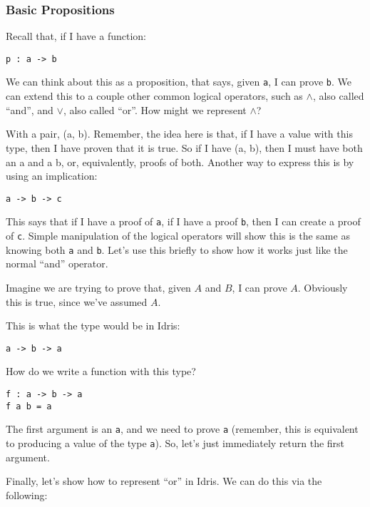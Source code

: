 \documentclass{article}
\newcommand{\inline}[1]{\texttt{#1}}
\begin{document}
\subsubsection{Basic Propositions}

Recall that, if I have a function:

\begin{verbatim}
p : a -> b
\end{verbatim}

We can think about this as a proposition, that says, given \inline{a}, I can prove \inline{b}.
We can extend this to a couple other common logical operators, such as $\wedge$, also called ``and'', and $\vee$, also called ``or''.
How might we represent $\wedge$?

With a pair, (a, b). Remember, the idea here is that, if I have a value with this type, then I have proven that it is true. So if I have (a, b), then I must have both an a and a b, or, equivalently, proofs of both. Another way to express this is by using an implication:

\begin{verbatim}
a -> b -> c
\end{verbatim}

This says that if I have a proof of \inline{a}, if I have a proof \inline{b}, then I can create a proof of \inline{c}.
Simple manipulation of the logical operators will show this is the same as knowing both \inline{a} and \inline{b}. %
Let’s use this briefly to show how it works just like the normal ``and'' operator.

Imagine we are trying to prove that, given $A$ and $B$, I can prove $A$.
Obviously this is true, since we've assumed $A$.

This is what the type would be in Idris:
\begin{verbatim}
a -> b -> a
\end{verbatim}

How do we write a function with this type?

\begin{verbatim}
f : a -> b -> a
f a b = a
\end{verbatim}

The first argument is an \inline{a}, and we need to prove \inline{a} (remember, this is equivalent to producing a value of the type \inline{a}).
So, let's just immediately return the first argument.

Finally, let’s show how to represent ``or'' in Idris.
We can do this via the following:
\end{document}
